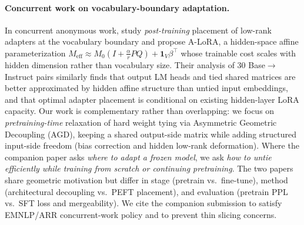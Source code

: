 
\paragraph{Concurrent work on vocabulary-boundary adaptation.}
In concurrent anonymous work, \citet{Anonymous2026b} study \emph{post-training} placement of low-rank adapters at the vocabulary boundary and propose A-LoRA, a hidden-space affine parameterization
$M_{\mathrm{eff}} \approx M_0 (I + \frac{\alpha}{r} P Q) + \mathbf{1}_V \beta^\top$
whose trainable cost scales with hidden dimension rather than vocabulary size.
Their analysis of 30 Base$\rightarrow$Instruct pairs similarly finds that output LM heads and tied shared matrices are better approximated by hidden affine structure than untied input embeddings, and that optimal adapter placement is conditional on existing hidden-layer LoRA capacity.
Our work is complementary rather than overlapping: we focus on \emph{pretraining-time} relaxation of hard weight tying via Asymmetric Geometric Decoupling (AGD), keeping a shared output-side matrix while adding structured input-side freedom (bias correction and hidden low-rank deformation).
Where the companion paper asks \emph{where to adapt a frozen model}, we ask \emph{how to untie efficiently while training from scratch or continuing pretraining}.
The two papers share geometric motivation but differ in stage (pretrain vs.\ fine-tune), method (architectural decoupling vs.\ PEFT placement), and evaluation (pretrain PPL vs.\ SFT loss and mergeability).
We cite the companion submission to satisfy EMNLP/ARR concurrent-work policy and to prevent thin slicing concerns.
